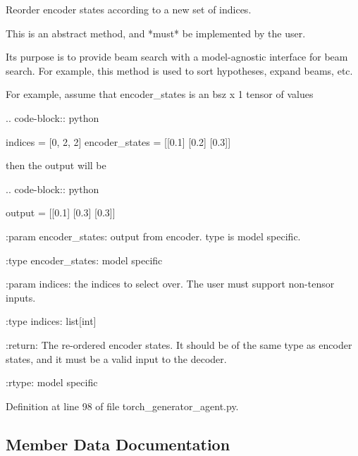 \begin{DoxyVerb}Reorder encoder states according to a new set of indices.

This is an abstract method, and *must* be implemented by the user.

Its purpose is to provide beam search with a model-agnostic interface for
beam search. For example, this method is used to sort hypotheses,
expand beams, etc.

For example, assume that encoder_states is an bsz x 1 tensor of values

.. code-block:: python

    indices = [0, 2, 2]
    encoder_states = [[0.1]
              [0.2]
              [0.3]]

then the output will be

.. code-block:: python

    output = [[0.1]
      [0.3]
      [0.3]]

:param encoder_states:
    output from encoder. type is model specific.

:type encoder_states:
    model specific

:param indices:
    the indices to select over. The user must support non-tensor
    inputs.

:type indices: list[int]

:return:
    The re-ordered encoder states. It should be of the same type as
    encoder states, and it must be a valid input to the decoder.

:rtype:
    model specific
\end{DoxyVerb}
 

Definition at line 98 of file torch\+\_\+generator\+\_\+agent.\+py.



\subsection{Member Data Documentation}
\mbox{\label{classparlai_1_1core_1_1torch__generator__agent_1_1TorchGeneratorModel_a1d9cfef6046368b5e7b77bc44b13473e}} 
